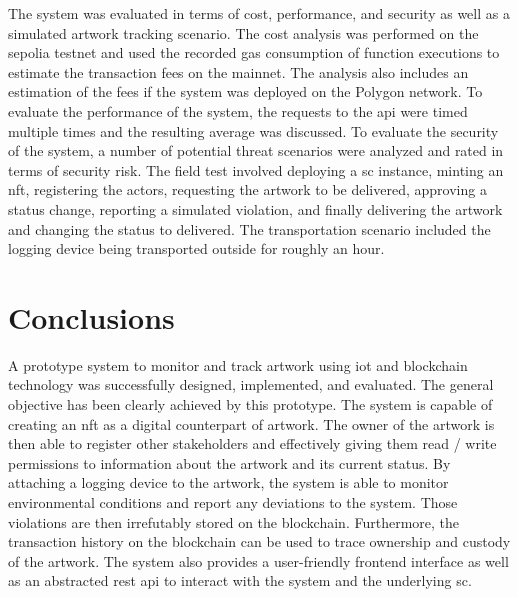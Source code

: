 The system was evaluated in terms of cost, performance, and security as well as a simulated artwork tracking scenario. The cost analysis was performed on the sepolia testnet and used the recorded gas consumption of function executions to estimate the transaction fees on the mainnet. The analysis also includes an estimation of the fees if the system was deployed on the Polygon network. To evaluate the performance of the system, the requests to the \gls{api} were timed multiple times and the resulting average was discussed. To evaluate the security of the system, a number of potential threat scenarios were analyzed and rated in terms of security risk.  The field test involved deploying a \gls{sc} instance, minting an \gls{nft}, registering the actors, requesting the artwork to be delivered, approving a status change, reporting a simulated violation, and finally delivering the artwork and changing the status to delivered. The transportation scenario included the logging device being transported outside for roughly an hour. 

\section{Conclusions}
A prototype system to monitor and track artwork using \gls{iot} and blockchain technology was successfully designed, implemented, and evaluated. The general objective has been clearly achieved by this prototype. The system is capable of creating an \gls{nft} as a digital counterpart of artwork. The owner of the artwork is then able to register other stakeholders and effectively giving them read / write permissions to information about the artwork and its current status. By attaching a logging device to the artwork, the system is able to monitor environmental conditions and report any deviations to the system. Those violations are then irrefutably stored on the blockchain. Furthermore, the transaction history on the blockchain can be used to trace ownership and custody of the artwork. The system also provides a user-friendly frontend interface as well as an abstracted \gls{rest} \gls{api} to interact with the system and the underlying \gls{sc}.


